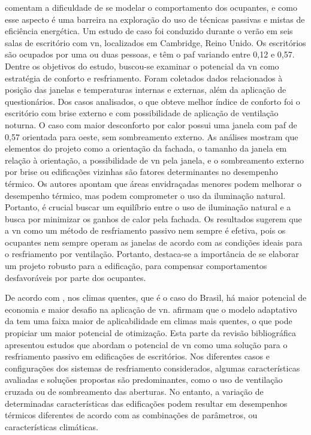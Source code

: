 \documentclass[brazil,hardcopy,openany]{ufscthesis} %
\begin{document}
 comentam a dificuldade de se modelar o comportamento dos ocupantes, e como esse aspecto é uma barreira na exploração do uso de técnicas passivas e mistas de eficiência energética. Um estudo de caso foi conduzido durante o verão em seis salas de escritório com \acrshort{vn}, localizados em Cambridge, Reino Unido. Os escritórios são ocupados por uma ou duas pessoas, e têm o \acrshort{paf} variando entre 0,12 e 0,57. Dentre os objetivos do estudo, buscou-se examinar o potencial da \acrshort{vn} como estratégia de conforto e resfriamento. Foram coletados dados relacionados à posição das janelas e temperaturas internas e externas, além da aplicação de questionários.
Dos casos analisados, o que obteve melhor índice de conforto foi o escritório com brise externo e com possibilidade de aplicação de ventilação noturna. O caso com maior desconforto por calor possui uma janela com \acrshort{paf} de 0,57 orientada para oeste, sem sombreamento externo. As análises mostram que elementos do projeto como a orientação da fachada, o tamanho da janela em relação à orientação, a possibilidade de \acrlong{vn} pela janela, e o sombreamento externo por brise ou edificações vizinhas são fatores determinantes no desempenho térmico. Os autores apontam que áreas envidraçadas menores podem melhorar o desempenho térmico, mas podem comprometer o uso da iluminação natural. Portanto, é crucial buscar um equilíbrio entre o uso de iluminação natural e a busca por minimizar os ganhos de calor pela fachada. Os resultados sugerem que a \acrshort{vn} como um método de resfriamento passivo nem sempre é efetiva, pois os ocupantes nem sempre operam as janelas de acordo com as condições ideais para o resfriamento por ventilação. Portanto, destaca-se a importância de se elaborar um projeto robusto para a edificação, para compensar comportamentos desfavoráveis por parte dos ocupantes.

De acordo com , nos climas quentes, que é o caso do Brasil, há maior potencial de economia e maior desafio na aplicação de \acrshort{vn}.  afirmam que o modelo adaptativo da  tem uma faixa maior de aplicabilidade em climas mais quentes, o que pode propiciar um maior potencial de otimização.
Esta parte da revisão bibliográfica apresentou estudos que abordam o potencial de \acrshort{vn} como uma solução para o resfriamento passivo em edificações de escritórios. Nos diferentes casos e configurações dos sistemas de resfriamento considerados, algumas características avaliadas e soluções propostas são predominantes, como o uso de ventilação cruzada ou de sombreamento das aberturas.
No entanto, a variação de determinadas características das edificações podem resultar em desempenhos térmicos diferentes de acordo com as combinações de parâmetros, ou características climáticas. 
\end{document}
